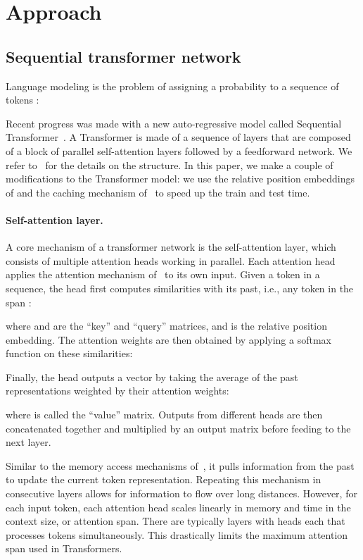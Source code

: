 \documentclass[11pt,a4paper]{article}
\begin{document}
\section{Approach}

\subsection{Sequential transformer network}
\label{sec:fixed}

Language modeling is the problem of assigning a probability to a sequence of tokens :

Recent progress was made with a new auto-regressive model called Sequential Transformer~\citep{vaswani2017attention}.
A Transformer is made of a sequence of layers that are composed of a block of parallel self-attention layers followed by a feedforward network.
We refer to~\citet{vaswani2017attention} for the details on the structure.
In this paper, we make a couple of modifications to the Transformer model:
we use the relative position embeddings of \citet{shaw2018self} and the caching mechanism of~\citet{dai2018transformer} to speed up the train and test time.

\paragraph{Self-attention layer.}
A core mechanism of a transformer network is the self-attention layer, which consists of multiple attention heads working in parallel.
Each attention head applies the attention mechanism of~\citet{bahdanau2014neural} to its own input.
Given a token  in a sequence, the head first computes similarities with its past, i.e., any token  in the span :

where  and  are the ``key'' and ``query'' matrices, and  is the relative position embedding.
The attention weights are then obtained by applying a softmax function on these similarities:

Finally, the head outputs a vector  by taking the average of the past representations weighted by their attention weights:

where  is called the ``value'' matrix. Outputs from different heads are then concatenated together and multiplied by an output matrix  before feeding to the next layer.

Similar to the memory access mechanisms of~\citet{sukhbaatar2015end}, it pulls information from the past to update the current token representation.
Repeating this mechanism in consecutive layers allows for information to flow over long distances.
However, for each input token, each attention head scales linearly in memory and time in the context size, or attention span.
There are typically  layers with  heads each that processes  tokens simultaneously.
This drastically limits the maximum attention span used in Transformers.
\end{document}
